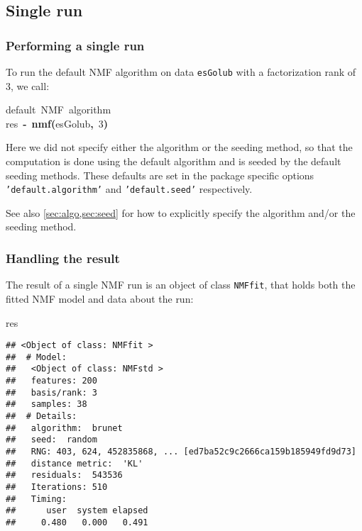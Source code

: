 \documentclass[a4paper]{article}\usepackage{graphicx, color}
\makeatletter
\newcommand{\hlnumber}[1]{\textcolor[rgb]{0,0,0}{#1}}%
\newcommand{\hlfunctioncall}[1]{\textcolor[rgb]{0.501960784313725,0,0.329411764705882}{\textbf{#1}}}%
\newcommand{\hlkeyword}[1]{\textcolor[rgb]{0,0,0}{\textbf{#1}}}%
\newcommand{\hlcomment}[1]{\textcolor[rgb]{0.180392156862745,0.6,0.341176470588235}{#1}}%
\newcommand{\hlassignement}[1]{\textcolor[rgb]{0,0,0}{\textbf{#1}}}%
\newcommand{\hlsymbol}[1]{\textcolor[rgb]{0,0,0}{#1}}%
\newcommand{\hlstd}[1]{\textcolor[rgb]{0,0,0}{#1}}%
\newenvironment{kframe}{%
 \def\FrameCommand##1{\hskip\@totalleftmargin \hskip-\fboxsep
 \colorbox{shadecolor}{##1}\hskip-\fboxsep
     \hskip-\linewidth \hskip-\@totalleftmargin \hskip\columnwidth}%
 \MakeFramed {\advance\hsize-\width
   \@totalleftmargin\z@ \linewidth\hsize
   \@setminipage}}%
 {\par\unskip\endMakeFramed}
\newenvironment{knitrout}{}{} %
\let\code=\texttt
\makeatother
\begin{document}
\subsection{Single run}\label{sec:single_run}

\subsubsection{Performing a single run}
To run the default NMF algorithm on data \code{esGolub} with a factorization rank of 3, we call: 

\begin{knitrout}
\color{fgcolor}\begin{kframe}
\begin{flushleft}
\ttfamily\noindent
\hlcomment{\usebox{\hlnormalsizeboxhash}{\ }default{\ }NMF{\ }algorithm}\hspace*{\fill}\\
\hlstd{}\hlsymbol{res}{\ }\hlassignement{\usebox{\hlnormalsizeboxlessthan}-}{\ }\hlfunctioncall{nmf}\hlkeyword{(}\hlsymbol{esGolub}\hlkeyword{,}{\ }\hlnumber{3}\hlkeyword{)}\mbox{}
\normalfont
\end{flushleft}
\end{kframe}
\end{knitrout}


Here we did not specify either the algorithm or the seeding method, so that the computation is done using the default algorithm and is seeded by the 
default seeding methods.
These defaults are set in the package specific options \code{'default.algorithm'} 
and \code{'default.seed'} respectively.

See also \cref{sec:algo,sec:seed} for how to explicitly specify the algorithm and/or the seeding method.

\subsubsection{Handling the result}

The result of a single NMF run is an object of class \code{NMFfit}, that holds both the fitted NMF model and data about the run:

\begin{knitrout}
\color{fgcolor}\begin{kframe}
\begin{flushleft}
\ttfamily\noindent
\hlsymbol{res}\mbox{}
\normalfont
\end{flushleft}
\begin{verbatim}
## <Object of class: NMFfit >
##  # Model:
##   <Object of class: NMFstd >
##   features: 200 
##   basis/rank: 3 
##   samples: 38 
##  # Details:
##   algorithm:  brunet 
##   seed:  random 
##   RNG: 403, 624, 452835868, ... [ed7ba52c9c2666ca159b185949fd9d73]
##   distance metric:  'KL' 
##   residuals:  543536 
##   Iterations: 510 
##   Timing:
##      user  system elapsed 
##     0.480   0.000   0.491 
\end{verbatim}
\end{kframe}
\end{knitrout}
\end{document}
